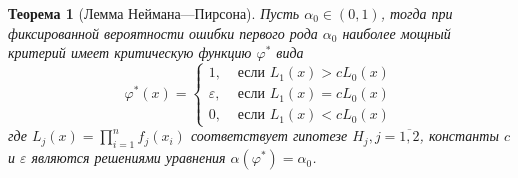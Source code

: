 \documentclass[oneside,final,14pt]{extreport}
\newtheorem{thm}{Теорема}[section]
\theoremstyle{definition}
\begin{document}
\begin{thm}[Лемма Неймана---Пирсона]
Пусть $\alpha_{0} \in(0,1)$, тогда при фиксированной вероятности ошибки первого рода $\alpha_{0}$ наиболее мощный критерий имеет критическую функцию $\varphi^{*}$ вида
\begin{equation*}
    \varphi^{*}(x)=\left\{\begin{array}{ll}
    1, & \text { если } L_{1}(x)>c L_{0}(x) \\
    \varepsilon, & \text { если } L_{1}(x)=c L_{0}(x) \\
    0, & \text { если } L_{1}(x)<c L_{0}(x)
    \end{array}\right.
\end{equation*}
где $L_{j}(x)=\prod_{i=1}^{n} f_{j}\left(x_{i}\right)$ соответствует гипотезе $H_j, j = \overline{1,2}$, константы $c$ и $\varepsilon$ являются решениями уравнения $\alpha\left(\varphi^{*}\right)=\alpha_{0}$.
\end{thm}
\end{document}
